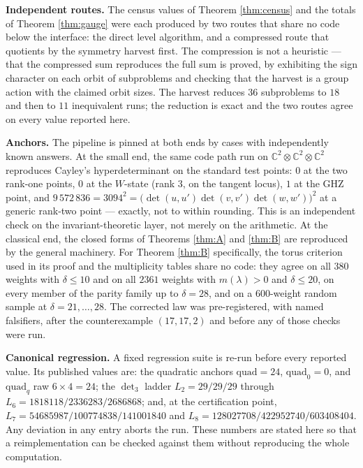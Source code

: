 \documentclass[11pt,reqno]{amsart}
\theoremstyle{plain}
\theoremstyle{definition}
\newcommand{\bC}{\mathbb{C}}
\begin{document}
\smallskip
\noindent\textbf{Independent routes.}  The census values of Theorem
\ref{thm:census} and the totals of Theorem \ref{thm:gauge} were each produced by
two routes that share no code below the interface: the direct level algorithm,
and a compressed route that quotients by the symmetry harvest first.  The
compression is not a heuristic --- that the compressed sum reproduces the full
sum is proved, by exhibiting the sign character on each orbit of subproblems
and checking that the harvest is a group action with the claimed orbit sizes.
The harvest reduces $36$ subproblems to $18$ and then to $11$ inequivalent
runs; the reduction is exact and the two routes agree on every value reported
here.

\smallskip
\noindent\textbf{Anchors.}  The pipeline is pinned at both ends by cases with
independently known answers.  At the small end, the same code path run on
$\bC^{2}\otimes\bC^{2}\otimes\bC^{2}$ reproduces Cayley's hyperdeterminant
\cite{GKZ} on the standard test points: $0$ at the two rank-one points, $0$ at
the $W$-state (rank $3$, on the tangent locus), $1$ at the GHZ point, and
$9\,572\,836=3094^{2}=\big(\det(u,u')\det(v,v')\det(w,w')\big)^{2}$ at a
generic rank-two point --- exactly, not to within rounding.  This is an
independent check on the invariant-theoretic layer, not merely on the
arithmetic.  At the classical end, the closed forms of Theorems
\ref{thm:A} and \ref{thm:B} are reproduced by the general machinery.  For
Theorem \ref{thm:B} specifically, the torus criterion used in its proof and the
multiplicity tables share no code: they agree on all $380$ weights with
$\delta\le10$ and on all $2361$ weights with $m(\lambda)>0$ and $\delta\le20$,
on every member of the parity family up to $\delta=28$, and on a $600$-weight
random sample at $\delta=21,\dots,28$.  The corrected law was pre-registered,
with named falsifiers, after the counterexample $(17,17,2)$ and before any of
those checks were run.

\smallskip
\noindent\textbf{Canonical regression.}  A fixed regression suite is re-run
before every reported value.  Its published values are: the quadratic anchors
$\mathrm{quad}=24$, $\mathrm{quad}_0=0$, and $\mathrm{quad}_q$ raw $6\times4=24$;
the $\det_3$ ladder $L_2=29/29/29$ through
$L_6=1818118/2336283/2686868$; and, at the certification point,
$L_7=54685987/100774838/141001840$ and
$L_8=128027708/422952740/603408404$.  Any deviation in any entry aborts the
run.  These numbers are stated here so that a reimplementation can be checked
against them without reproducing the whole computation.
\end{document}
